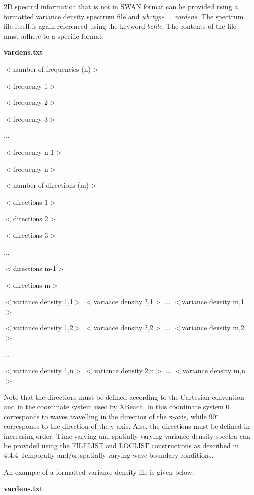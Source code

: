 \documentclass{article}
\begin{document}
\noindent 2D spectral information that is not in SWAN format can be provided using a formatted variance density spectrum file and \textit{wbctype = vardens}. The spectrum file itself is again referenced using the keyword \textit{bcfile}. The contents of the file must adhere to a specific format:

\noindent \textbf{vardens.txt}

\noindent $<$number of frequencies (n)$>$

\noindent $<$frequency 1$>$

\noindent $<$frequency 2$>$

\noindent $<$frequency 3$>$

\noindent ...

\noindent $<$frequency n-1$>$

\noindent $<$frequency n$>$

\noindent $<$number of directions (m)$>$

\noindent $<$directions 1$>$

\noindent $<$directions 2$>$

\noindent $<$directions 3$>$

\noindent ...

\noindent $<$directions m-1$>$

\noindent $<$directions m$>$

\noindent $<$variance density 1,1$>$ $<$variance density 2,1$>$ ... $<$variance density m,1$>$

\noindent $<$variance density 1,2$>$ $<$variance density 2,2$>$ ... $<$variance density m,2$>$

\noindent ...

\noindent $<$variance density 1,n$>$ $<$variance density 2,n$>$ ... $<$variance density m,n$>$

\noindent Note that the directions must be defined according to the Cartesian convention and in the coordinate system used by XBeach. In this coordinate system 0${}^\circ$ corresponds to waves travelling in the direction of the x-axis, while 90${}^\circ$ corresponds to the direction of the y-axis. Also, the directions must be defined in increasing order. Time-varying and spatially varying variance density spectra can be provided using the FILELIST and LOCLIST constructions as described in 4.4.4 Temporally and/or spatially varying wave boundary conditions.

\noindent An example of a formatted variance density file is given below:

\noindent \textbf{vardens.txt}
\end{document}

